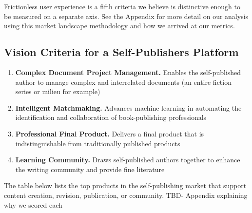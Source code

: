 \documentclass[10pt,openany]{book}
\providecommand{\tightlist}{%
  \setlength{\itemsep}{0pt}\setlength{\parskip}{0pt}}
\begin{document}
Frictionless user experience is a fifth criteria we believe is
distinctive enough to be measured on a separate axis. See the Appendix
for more detail on our analysis using this market landscape methodology
and how we arrived at our metrics.

\hypertarget{vision-criteria-for-a-self-publishers-platform}{%
\subsection{Vision Criteria for a Self-Publishers
Platform}\label{vision-criteria-for-a-self-publishers-platform}}

\begin{enumerate}
\def\labelenumi{\arabic{enumi}.}
\tightlist
\item
  \textbf{Complex Document Project Management.} Enables the
  self-published author to manage complex and interrelated documents (an
  entire fiction series or milieu for example)
\item
  \textbf{Intelligent Matchmaking.} Advances machine learning in
  automating the identification and collaboration of book-publishing
  professionals
\item
  \textbf{Professional Final Product.} Delivers a final product that is
  indistinguishable from traditionally published products
\item
  \textbf{Learning Community.} Draws self-published authors together to
  enhance the writing community and provide fine literature
\end{enumerate}

The table below lists the top products in the self-publishing market
that support content creation, revision, publication, or community. TBD-
Appendix explaining why we scored each

\newpage
\end{document}

